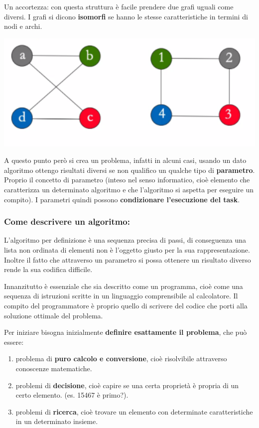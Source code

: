 \documentclass[
  paper=a4,
  oneside  ,captions=tableheading
]{scrbook}
\providecommand{\tightlist}{%
  \setlength{\itemsep}{0pt}\setlength{\parskip}{0pt}}
\begin{document}
Un accortezza: con questa struttura è facile prendere due grafi uguali
come diversi. I grafi si dicono \textbf{isomorfi} se hanno le stesse
caratteristiche in termini di nodi e archi.

\includegraphics{./image/image-20201110233258123.png}

A questo punto però si crea un problema, infatti in alcuni casi, usando
un dato algoritmo ottengo risultati diversi se non qualifico un qualche
tipo di \textbf{parametro}. Proprio il concetto di parametro (inteso nel
senso informatico, cioè elemento che caratterizza un determinato
algoritmo e che l'algoritmo si aspetta per eseguire un compito). I
parametri quindi possono \textbf{condizionare l'esecuzione del task}.

\hypertarget{come-descrivere-un-algoritmo}{%
\subsubsection{Come descrivere un
algoritmo:}\label{come-descrivere-un-algoritmo}}

L'algoritmo per definizione è una sequenza precisa di passi, di
conseguenza una lista non ordinata di elementi non è l'oggetto giusto
per la sua rappresentazione. Inoltre il fatto che attraverso un
parametro si possa ottenere un risultato diverso rende la sua codifica
difficile.

Innanzitutto è essenziale che sia descritto come un programma, cioè come
una sequenza di istruzioni scritte in un linguaggio comprensibile al
calcolatore. Il compito del programmatore è proprio quello di scrivere
del codice che porti alla soluzione ottimale del problema.

Per iniziare bisogna inizialmente \textbf{definire esattamente il
problema}, che può essere:

\begin{enumerate}
\def\labelenumi{\arabic{enumi}.}
\tightlist
\item
  problema di \textbf{puro calcolo e conversione}, cioè risolvibile
  attraverso conoscenze matematiche.
\item
  problemi di \textbf{decisione}, cioè capire se una certa proprietà è
  propria di un certo elemento. (es. 15467 è primo?).
\item
  problemi di \textbf{ricerca}, cioè trovare un elemento con determinate
  caratteristiche in un determinato insieme.
\end{enumerate}
\end{document}
